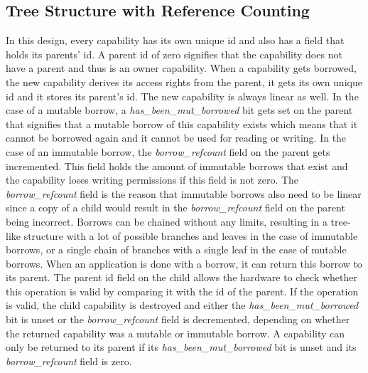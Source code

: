 \subsection{Tree Structure with Reference Counting}
In this design, every capability has its own unique id and also has a field that holds its parents' id. A parent id of zero signifies that the capability does not have a parent and thus is an owner capability. When a capability gets borrowed, the new capability derives its access rights from the parent, it gets its own unique id and it stores its parent's id. The new capability is always linear as well. In the case of a mutable borrow, a \textit{has\_been\_mut\_borrowed} bit gets set on the parent that signifies that a mutable borrow of this capability exists which means that it cannot be borrowed again and it cannot be used for reading or writing. In the case of an immutable borrow, the \textit{borrow\_refcount} field on the parent gets incremented. This field holds the amount of immutable borrows that exist and the capability loses writing permissions if this field is not zero. The \textit{borrow\_refcount} field is the reason that immutable borrows also need to be linear since a copy of a child would result in the \textit{borrow\_refcount} field on the parent being incorrect.
Borrows can be chained without any limits, resulting in a tree-like structure with a lot of possible branches and leaves in the case of immutable borrows, or a single chain of branches with a single leaf in the case of mutable borrows. When an application is done with a borrow, it can return this borrow to its parent. The parent id field on the child allows the hardware to check whether this operation is valid by comparing it with the id of the parent. If the operation is valid, the child capability is destroyed and either the \textit{has\_been\_mut\_borrowed} bit is unset or the \textit{borrow\_refcount} field is decremented, depending on whether the returned capability was a mutable or immutable borrow. A capability can only be returned to its parent if its \textit{has\_been\_mut\_borrowed} bit is unset and its \textit{borrow\_refcount} field is zero.

